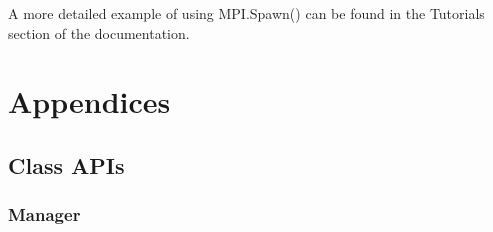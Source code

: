 \documentclass[letterpaper,10pt,english]{sphinxmanual}
\begin{document}
A more detailed example of using MPI.Spawn() can be found in the Tutorials section
of the documentation.


\chapter{Appendices}
\label{\detokenize{appendix:appendices}}\label{\detokenize{appendix::doc}}

\section{Class APIs}
\label{\detokenize{appendix:class-apis}}

\subsection{Manager}
\label{\detokenize{manager:manager}}\label{\detokenize{manager::doc}}
\end{document}
